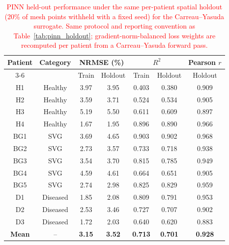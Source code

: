 ﻿\documentclass[12pt,a4paper]{article}
\theoremstyle{definition}
\numberwithin{equation}{section}
\begin{document}
\begin{table}[!htbp]
\color{red}%
\centering
\setlength{\tabcolsep}{4pt}
\renewcommand{\arraystretch}{0.95}
\caption{\textcolor{red}{PINN held-out performance under the same per-patient spatial holdout (20\% of mesh points withheld with a fixed seed) for the Carreau--Yasuda surrogate. Same protocol and reporting convention as Table~\ref{tab:pinn_holdout}; gradient-norm-balanced loss weights are recomputed per patient from a Carreau--Yasuda forward pass.}}
\label{tab:pinn_holdout_cy}
\begin{tabular}{|c|c|c|c|c|c|c|}
\hline
\multirow{2}{*}{\textbf{Patient}} & \multirow{2}{*}{\textbf{Category}} & \multicolumn{2}{c|}{\textbf{NRMSE (\%)}} & \multicolumn{2}{c|}{\textbf{$R^2$}} & \textbf{Pearson $r$} \\
\cline{3-6}
 & & Train & Holdout & Train & Holdout & Holdout \\
\hline
H1 & Healthy & 3.97 & 3.95 & 0.403 & 0.380 & 0.909 \\
H2 & Healthy & 3.59 & 3.71 & 0.524 & 0.534 & 0.905 \\
H3 & Healthy & 5.19 & 5.50 & 0.611 & 0.609 & 0.897 \\
H4 & Healthy & 1.67 & 1.95 & 0.896 & 0.890 & 0.966 \\
BG1 & SVG & 3.69 & 4.65 & 0.903 & 0.902 & 0.968 \\
BG2 & SVG & 2.73 & 3.57 & 0.733 & 0.718 & 0.938 \\
BG3 & SVG & 3.54 & 3.70 & 0.815 & 0.785 & 0.949 \\
BG4 & SVG & 4.59 & 4.61 & 0.664 & 0.651 & 0.905 \\
BG5 & SVG & 2.74 & 2.98 & 0.825 & 0.829 & 0.959 \\
D1 & Diseased & 1.85 & 2.08 & 0.809 & 0.791 & 0.953 \\
D2 & Diseased & 2.53 & 3.46 & 0.727 & 0.707 & 0.902 \\
D3 & Diseased & 1.72 & 2.03 & 0.640 & 0.620 & 0.883 \\
\hline
\textbf{Mean} & -- & \textbf{3.15} & \textbf{3.52} & \textbf{0.713} & \textbf{0.701} & \textbf{0.928} \\
\hline
\end{tabular}
\end{table}
\end{document}

